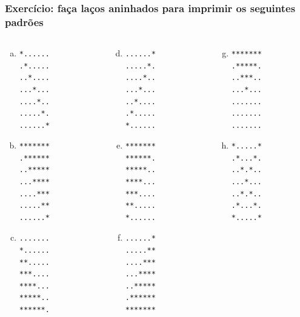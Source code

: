 \documentclass[xcolor={dvipsnames,table},aspectratio=169]{beamer}
\begin{document}
\begin{frame}[fragile]\frametitle{Exercício: faça laços aninhados para imprimir os seguintes padrões}
{\tiny
\begin{columns}[T]
	\begin{column}{0.2\linewidth}
\begin{enumerate}[a)]
	\item	
\begin{verbatim}
*......
.*.....
..*....
...*...
....*..
.....*.
......*

\end{verbatim}
	\item
\begin{verbatim}
*******
.******
..*****
...****
....***
.....**
......*

\end{verbatim}
	\item
\begin{verbatim}
.......
*......
**.....
***....
****...
*****..
******.
\end{verbatim}
\end{enumerate}
	\end{column}
	\begin{column}{0.2\linewidth}
\begin{enumerate}[a)]
  \setcounter{enumi}{3}
	\item
\begin{verbatim}
......*
.....*.
....*..
...*...
..*....
.*.....
*......

\end{verbatim}
	\item
\begin{verbatim}
*******
******.
*****..
****...
***....
**.....
*......

\end{verbatim}
	\item
\begin{verbatim}
......*
.....**
....***
...****
..*****
.******
*******
\end{verbatim}
\end{enumerate}
	\end{column}
	\begin{column}{0.2\linewidth}
\begin{enumerate}[a)]
  \setcounter{enumi}{6}
	\item
\begin{verbatim}
*******
.*****.
..***..
...*...
.......
.......
.......

\end{verbatim}
	\item
\begin{verbatim}
*.....*
.*...*.
..*.*..
...*...
..*.*..
.*...*.
*.....*


\end{verbatim}
\end{enumerate}
\end{column}
\end{columns}}
\end{frame}
\end{document}

